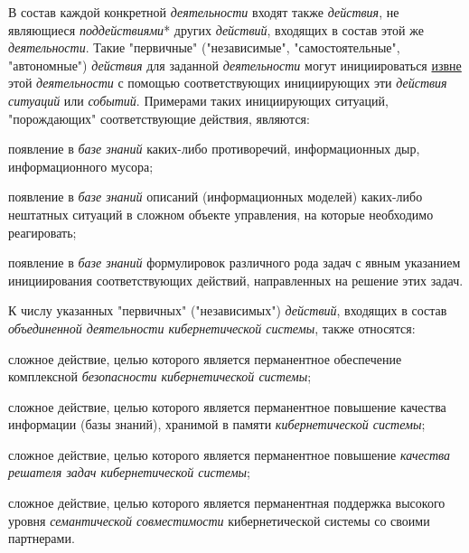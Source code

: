 \begin{SCn}
{В состав каждой конкретной \textit{деятельности} входят также \textit{действия}, не являющиеся \textit{поддействиями}* других \textit{действий}, входящих в состав этой же \textit{деятельности}. Такие "первичные"{} ("независимые"{}, "самостоятельные"{}, "автономные"{}) \textit{действия} для заданной \textit{деятельности} могут инициироваться \uline{извне} этой \textit{деятельности} с помощью соответствующих инициирующих эти \textit{действия ситуаций} или \textit{событий}. Примерами таких инициирующих ситуаций, "порождающих"{} соответствующие действия, являются:
\begin{scnitemize}
	\item появление в \textit{базе знаний} каких-либо противоречий, информационных дыр, информационного мусора;
	\item появление в \textit{базе знаний} описаний (информационных моделей) каких-либо нештатных ситуаций в сложном объекте управления, на которые необходимо реагировать;
	\item появление в \textit{базе знаний} формулировок различного рода задач с явным указанием инициирования соответствующих действий, направленных на решение этих задач.
\end{scnitemize}
	К числу указанных "первичных"{} ("независимых"{}) \textit{действий}, входящих в состав \textit{объединенной деятельности кибернетической системы}, также относятся:
\begin{scnitemize}
	\item сложное действие, целью которого является перманентное обеспечение комплексной \textit{безопасности кибернетической системы};
	\item сложное действие, целью которого является перманентное  повышение качества информации (базы знаний), хранимой в памяти \textit{кибернетической системы};
	\item сложное действие, целью которого является перманентное повышение \textit{качества решателя задач кибернетической системы};
	\item сложное действие, целью которого является перманентная поддержка высокого уровня \textit{семантической совместимости} кибернетической системы со своими партнерами.
\end{scnitemize}
}


\end{SCn}
